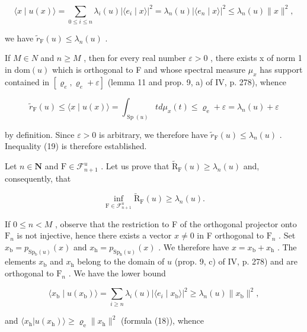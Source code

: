 \[
\langle x \mid u (x) \rangle = \sum_ {0 \leqslant i \leqslant n} \lambda_ {i} (u) | \langle e _ {i} \mid x \rangle | ^ {2} = \lambda_ {n} (u) | \langle e _ {n} \mid x \rangle | ^ {2} \leqslant \lambda_ {n} (u) \| x \| ^ {2},
\]

we have \(\widetilde{r}_{\mathrm{F}}(u) \leqslant \lambda_n(u)\) .

If \(M \in N\) and \(n \geqslant M\) , then for every real number \(\varepsilon > 0\) , there exists x of norm 1 in \(\text{dom}(u)\) which is orthogonal to F and whose spectral measure \(\mu_{x}\) has support contained in \([\varrho_{e}, \varrho_{e} + \varepsilon]\) (lemma 11 and prop. 9, a) of IV, p. 278), whence

\[
\widetilde {r} _ {\mathrm{F}} (u) \leqslant \langle x \mid u (x) \rangle = \int_ {\operatorname{Sp} (u)} t d \mu_ {x} (t) \leqslant \varrho_ {\mathrm{e}} + \varepsilon = \lambda_ {n} (u) + \varepsilon
\]

by definition. Since \(\varepsilon > 0\) is arbitrary, we therefore have \(\widetilde{r}_{\mathrm{F}}(u) \leqslant \lambda_n(u)\) . Inequality (19) is therefore established.

Let \(n \in \mathbf{N}\) and \(\mathrm{F} \in \mathcal{F}_{n+1}^{u}\) . Let us prove that \(\widetilde{\mathrm{R}}_{\mathrm{F}}(u) \geqslant \lambda_{n}(u)\) and, consequently, that

\[
\inf _ {\mathrm{F} \in \mathcal {F} _ {n + 1} ^ {u}} \widetilde {\mathrm{R}} _ {\mathrm{F}} (u) \geqslant \lambda_ {n} (u).\tag{20}
\]

If \(0 \leqslant n < M\) , observe that the restriction to F of the orthogonal projector onto \(\mathrm{F}_n\) is not injective, hence there exists a vector \(x \neq 0\) in F orthogonal to \(\mathrm{F}_n\) . Set \(x_{\mathrm{b}} = p_{\mathrm{Sp}_{\mathrm{b}}(u)}(x)\) and \(x_{\mathrm{h}} = p_{\mathrm{Sp}_{\mathrm{h}}(u)}(x)\) . We therefore have \(x = x_{\mathrm{b}} + x_{\mathrm{h}}\) . The elements \(x_{\mathrm{b}}\) and \(x_{\mathrm{h}}\) belong to the domain of \(u\) (prop. 9, c) of IV, p. 278) and are orthogonal to \(\mathrm{F}_n\) . We have the lower bound

\[
\langle x _ {\mathrm{b}} \mid u (x _ {\mathrm{b}}) \rangle = \sum_ {i \geqslant n} \lambda_ {i} (u) | \langle e _ {i} \mid x _ {\mathrm{b}} \rangle | ^ {2} \geqslant \lambda_ {n} (u) \| x _ {\mathrm{b}} \| ^ {2},
\]

and \(\langle x_{\mathrm{h}}|u(x_{\mathrm{h}})\rangle \geqslant \varrho_{\mathrm{e}}\| x_{\mathrm{h}}\|^2\) (formula (18)), whence

